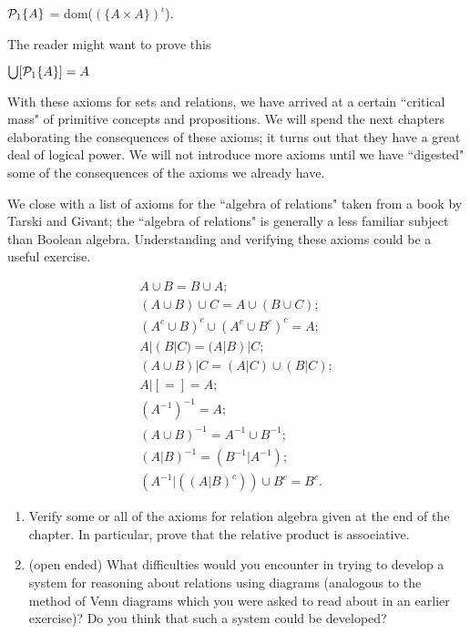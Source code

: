 \preuve  ${\cal P}_1\{A\}$ = dom($(\{A \times A\})^{\iota}$).
\finpreuve

The reader might want to prove this 

\begin{thm}
 $\bigcup[{\cal P}_1\{A\}] = A$
\end{thm}


With these axioms for sets and relations, we have arrived at a
certain ``critical mass" of primitive concepts and propositions.  We
will spend the next chapters elaborating the consequences of these
axioms; it turns out that they have a great deal of logical power.  We
will not introduce more axioms until we have ``digested" some of the
consequences of the axioms we already have.

We close with a list of axioms for the ``algebra of
relations"
taken from a book by Tarski and Givant; the ``algebra of relations" is
generally a less familiar subject than Boolean algebra.  Understanding
and verifying these axioms could be a useful exercise.

\begin{displaymath}
\begin{array}{l}
  A \cup B = B \cup A;\\[1mm]
  (A \cup B) \cup C = A \cup (B \cup C);\\[1mm]
  (A^c \cup B)^c \cup (A^c \cup B^c)^c = A;\\[1mm]
  A|(B|C) = (A|B)|C;\\[1mm]
  (A \cup B)|C = (A|C) \cup (B|C);\\[1mm]
  A|[=] = A;\\[1mm]
  (A^{-1})^{-1} = A;\\[1mm]
  (A \cup B)^{-1} = A^{-1} \cup B^{-1};\\[1mm]
  (A|B)^{-1} = (B^{-1}|A^{-1});\\[1mm]
  (A^{-1}|((A|B)^c)) \cup B^c = B^c.
\end{array}
\end{displaymath}


\Exercises

\begin{enumerate}

\item  Verify some or all of the axioms for relation algebra given at the end of the chapter.  In particular, prove
  that the relative product is associative. 

\item (open ended)  What difficulties would you encounter in trying to develop
  a system for reasoning about relations using diagrams (analogous to the
  method of Venn diagrams which you were asked to read
  about in an earlier exercise)?  Do you think that such a system could be
  developed?

\end{enumerate}
                                   
